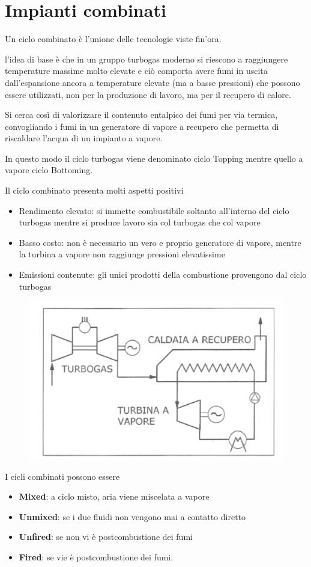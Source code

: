 \part{Impianti combinati}
\begin{adjustwidth}{2in}{}
	Un ciclo combinato è l'unione delle tecnologie viste fin'ora. 
	
	l'idea di base è che in un gruppo turbogas moderno si riescono a raggiungere temperature massime molto elevate e ciò comporta avere fumi in uscita dall'espansione ancora a temperature elevate (ma a basse pressioni) che possono essere utilizzati, non per la produzione di lavoro, ma per il recupero di calore. 
	
	Si cerca così di valorizzare il contenuto entalpico dei fumi per via termica, convogliando i fumi in un generatore di vapore a recupero che permetta di riscaldare l'acqua di un impianto a vapore. 
	
	In questo modo il ciclo turbogas viene denominato ciclo Topping mentre quello a vapore ciclo Bottoming.  \newline 
	
	Il ciclo combinato presenta molti aspetti positivi
	\begin{itemize}
		\item Rendimento elevato: si immette combustibile soltanto all'interno del ciclo turbogas mentre si produce lavoro sia col turbogas che col vapore
		\item Basso costo: non è necessario un vero e proprio generatore di vapore, mentre la turbina a vapore non raggiunge pressioni elevatissime 
		\item Emissioni contenute: gli unici prodotti della combustione provengono dal ciclo turbogas
	\end{itemize}
\begin{figure}[H]
	\centering
	\includegraphics[width=0.5\linewidth]{immagini/impianticombinati}
	\label{fig:impianticombinati}
\end{figure}
	I cicli combinati possono essere 
	\begin{itemize}
		\item \textbf{Mixed}: a ciclo misto, aria viene miscelata a vapore 
		\item \textbf{Unmixed}: se i due fluidi non vengono mai a contatto diretto
		\item \textbf{Unfired}: se non vi è postcombustione dei fumi
		\item \textbf{Fired}: se vie è postcombustione dei fumi.
		

\end{itemize}
\end{adjustwidth}
